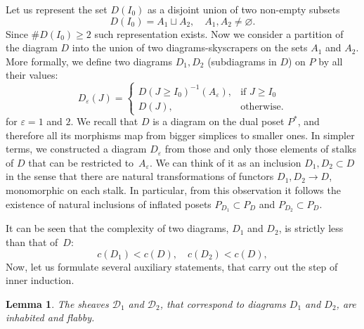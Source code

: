 \documentclass[english,12pt,oneside]{amsproc}
\newcommand{\ca}[1]{\mathcal{#1}}
\newcounter{stmcounter}[section]
\numberwithin{equation}{section}
\theoremstyle{plain}
\newtheorem{lem}[stmcounter]{Lemma}
\theoremstyle{definition}
\theoremstyle{remark}
\begin{document}
Let us represent the set $D(I_0)$ as a disjoint union of two non-empty subsets
\[
D(I_0)=A_1\sqcup A_2, \quad A_1,A_2\neq\varnothing.
\]
Since $\#D(I_0)\geqslant 2$ such representation exists. Now we consider a partition of the diagram $D$ into the union of two diagrams-skyscrapers on the sets $A_1$  and  $A_2$. More formally, we define two diagrams $D_1,D_2$ (subdiagrams in $D$) on $P$ by all their values:
\begin{equation}\label{eqSubDiag}
D_\varepsilon(J)=\begin{cases}
                   D(J\geqslant I_0)^{-1}(A_\varepsilon), & \mbox{if } J\geqslant I_0 \\
                   D(J), & \mbox{otherwise}.
                 \end{cases}
\end{equation}
for $\varepsilon=1$ and $2$. We recall that $D$ is a diagram on the dual poset $P^*$, and therefore all its morphisms map from bigger simplices to smaller ones. In simpler terms, we constructed a diagram $D_\varepsilon$ from those and only those elements of stalks of $D$ that can be restricted to~$A_\varepsilon$. We can think of it as an inclusion $D_1,D_2\subset D$ in the sense that there are natural transformations of functors $D_1,D_2\to D$, monomorphic on each stalk. In particular, from this observation it follows the existence of natural inclusions of inflated posets $P_{D_1}\subset P_D$ and $P_{D_2}\subset P_D$.

It can be seen that the complexity of two diagrams, $D_1$ and $D_2$, is strictly less than that of~$D$:
\[
c(D_1)<c(D),\quad c(D_2)<c(D),
\]
Now, let us formulate several auxiliary statements, that carry out the step of inner induction.

\begin{lem}\label{lemInhFlabby}
The sheaves $\ca{D}_1$ and $\ca{D}_2$, that correspond to diagrams $D_1$ and $D_2$, are inhabited and flabby.
\end{lem}
\end{document}
